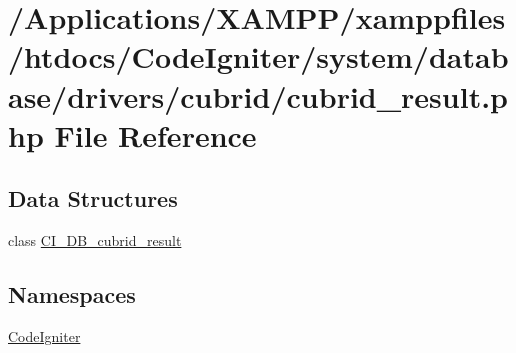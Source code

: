 \hypertarget{cubrid__result_8php}{}\section{/\+Applications/\+X\+A\+M\+P\+P/xamppfiles/htdocs/\+Code\+Igniter/system/database/drivers/cubrid/cubrid\+\_\+result.php File Reference}
\label{cubrid__result_8php}
\subsection*{Data Structures}
\begin{DoxyCompactItemize}
\item 
class \mbox{\hyperlink{class_c_i___d_b__cubrid__result}{C\+I\+\_\+\+D\+B\+\_\+cubrid\+\_\+result}}
\end{DoxyCompactItemize}
\subsection*{Namespaces}
\begin{DoxyCompactItemize}
\item 
 \mbox{\hyperlink{namespace_code_igniter}{Code\+Igniter}}
\end{DoxyCompactItemize}
